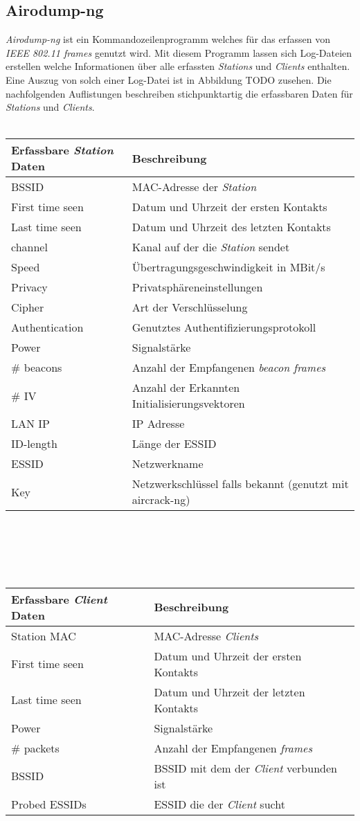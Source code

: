 \documentclass[]{report}
\begin{document}
\subsection{Airodump-ng}\label{airodump-ng}
\textit{Airodump-ng} ist ein Kommandozeilenprogramm welches für das erfassen von \textit{IEEE 802.11 frames} genutzt wird. Mit diesem Programm lassen sich Log-Dateien erstellen welche Informationen über alle erfassten \textit{Stations} und \textit{Clients} enthalten. Eine Auszug von solch einer Log-Datei ist in Abbildung TODO zusehen. Die nachfolgenden Auflistungen beschreiben stichpunktartig die erfassbaren Daten für \textit{Stations} und \textit{Clients}.\\ \\
\begin{tabular}{l | l}
\toprule
Erfassbare \textit{Station} Daten & Beschreibung \\
\midrule
BSSID & MAC-Adresse der \textit{Station} \\
First time seen & Datum und Uhrzeit der ersten Kontakts \\
Last time seen & Datum und Uhrzeit des letzten Kontakts \\
channel &  Kanal auf der die \textit{Station} sendet \\
Speed & Übertragungsgeschwindigkeit in MBit/s\\
Privacy & Privatsphäreneinstellungen \\
Cipher & Art der Verschlüsselung \\
Authentication & Genutztes Authentifizierungsprotokoll \\
Power & Signalstärke \\ 
\# beacons & Anzahl der Empfangenen \textit{beacon frames}\\
\# IV & Anzahl der Erkannten Initialisierungsvektoren \\
LAN IP &  IP Adresse \\
ID-length & Länge der ESSID \\
ESSID & Netzwerkname \\
Key & Netzwerkschlüssel falls bekannt (genutzt mit aircrack-ng) \\
\bottomrule
\end{tabular} \\ \\ \\ \\
\begin{tabular}{l | l}
\toprule
Erfassbare \textit{Client} Daten & Beschreibung \\
\midrule
Station MAC & MAC-Adresse \textit{Clients} \\
First time seen & Datum und Uhrzeit der ersten Kontakts \\
Last time seen & Datum und Uhrzeit der letzten Kontakts \\
Power & Signalstärke \\
\# packets & Anzahl der Empfangenen \textit{frames} \\
BSSID & BSSID mit dem der \textit{Client} verbunden ist \\
Probed ESSIDs & ESSID die der \textit{Client} sucht \\
\bottomrule
\end{tabular}
\end{document}
